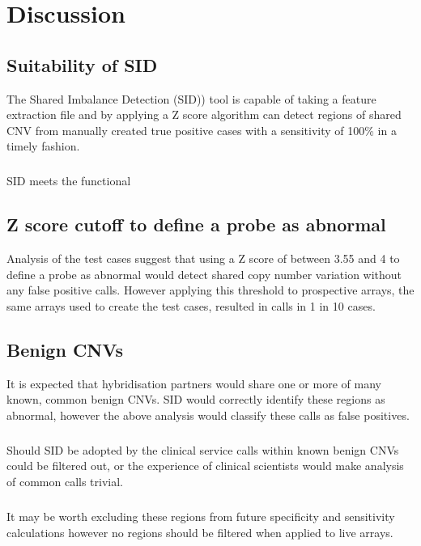\chapter{Discussion}\label{ch:Discussion} 
\section{Suitability of SID}
The Shared Imbalance Detection (SID)) tool is capable of taking a feature extraction file and by applying a Z score algorithm can detect regions of shared CNV from manually created true positive cases with a sensitivity of 100\% in a timely fashion.

\paragraph*{}
SID meets the functional 

\section{Z score cutoff to define a probe as abnormal}
Analysis of the test cases suggest that using a Z score of between 3.55 and 4 to define a probe as abnormal would detect shared copy number variation without any false positive calls. However applying this threshold to prospective arrays, the same arrays used to create the test cases, resulted in calls in 1 in 10 cases. 

\section{Benign CNVs}
It is expected that hybridisation partners would share one or more of many known, common benign CNVs. SID would correctly identify these regions as abnormal, however the above analysis would classify these calls as false positives.
\paragraph*{}
Should SID be adopted by the clinical service calls within known benign CNVs could be filtered out, or the experience of clinical scientists would make analysis of common calls trivial.
\paragraph*{}
It may be worth excluding these regions from future specificity and sensitivity calculations however no regions should be filtered when applied to live arrays.

